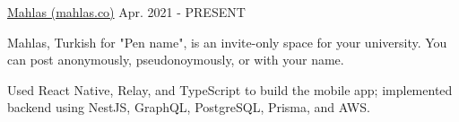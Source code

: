 
\vspace*{-1.5mm}
\begin{cventries}






  \project
    {\href{https://mahlas.co}{Mahlas (mahlas.co)}} %
    {Apr. 2021 - PRESENT} %
    {
      \begin{cvitems}
        \item {Mahlas, Turkish for "Pen name", is an invite-only space for your university. You can post anonymously, pseudonoymously, or with your name.}
        \item {Used React Native, Relay, and TypeScript to build the mobile app; implemented backend using NestJS, GraphQL, PostgreSQL, Prisma, and AWS.}
      \end{cvitems}
    }


\end{cventries}
